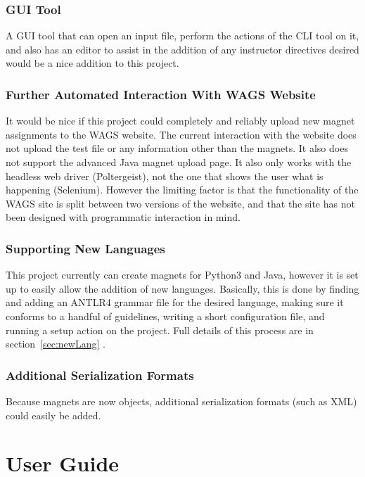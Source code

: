 \documentclass[letter,10pt,final]{article}
\begin{document}
\subsubsection{GUI Tool}

A GUI tool that can open an input file, perform the actions of the CLI 
tool on it, and also has an editor to assist in the addition of any 
instructor directives desired would be a nice addition to this project.

\subsubsection{Further Automated Interaction With WAGS Website}
It would be nice if this project could completely and reliably upload 
new magnet assignments to the WAGS website. The current interaction 
with the website does not upload the test file or any information other 
than the magnets. It also does not support the advanced Java magnet 
upload page. It also only works with the headless web driver 
(Poltergeist), not the one that shows the user what is happening 
(Selenium). However the limiting factor is that the functionality of 
the WAGS site is split between two versions of the website, and that 
the site has not been designed with programmatic interaction in mind.

\subsubsection{Supporting New Languages}

This project currently can create magnets for Python3 and Java, however 
it is set up to easily allow the addition of new languages. 
Basically, this is done by finding and adding an ANTLR4 grammar file 
for the desired language, making sure it conforms to a handful of 
guidelines, writing a short configuration file, and running a setup 
action on the project. Full details of this process are in 
section~\ref{sec:newLang} .


\subsubsection{Additional Serialization Formats}

Because magnets are now objects, additional serialization formats (such 
as XML) could easily be added. 



\section{User Guide}
\end{document}
